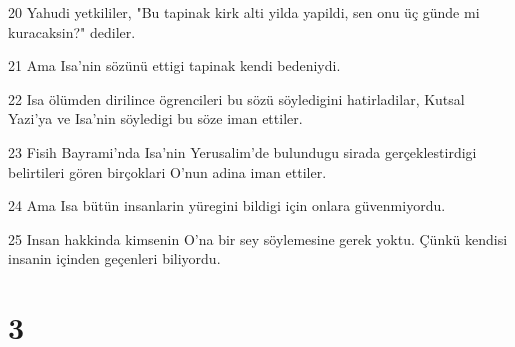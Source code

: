\par 20 Yahudi yetkililer, "Bu tapinak kirk alti yilda yapildi, sen onu üç günde mi kuracaksin?" dediler.
\par 21 Ama Isa'nin sözünü ettigi tapinak kendi bedeniydi.
\par 22 Isa ölümden dirilince ögrencileri bu sözü söyledigini hatirladilar, Kutsal Yazi'ya ve Isa'nin söyledigi bu söze iman ettiler.
\par 23 Fisih Bayrami'nda Isa'nin Yerusalim'de bulundugu sirada gerçeklestirdigi belirtileri gören birçoklari O'nun adina iman ettiler.
\par 24 Ama Isa bütün insanlarin yüregini bildigi için onlara güvenmiyordu.
\par 25 Insan hakkinda kimsenin O'na bir sey söylemesine gerek yoktu. Çünkü kendisi insanin içinden geçenleri biliyordu.

\chapter{3}

